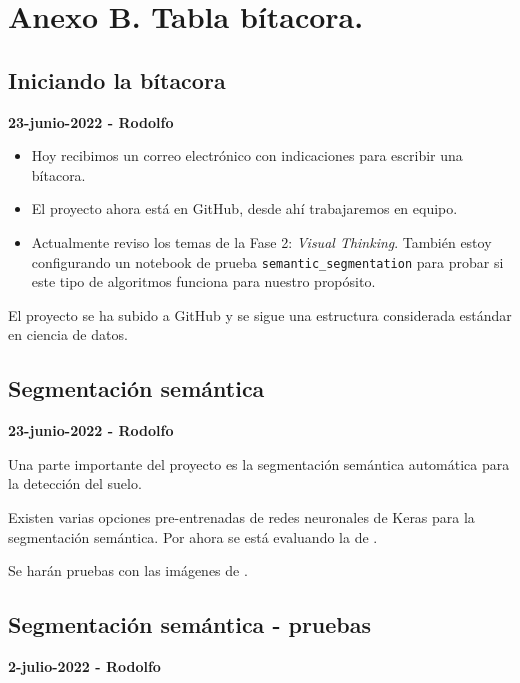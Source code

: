 \section{Anexo B. Tabla bítacora.}


\subsection*{Iniciando la bítacora}

\textbf{23-junio-2022 - Rodolfo}


\begin{itemize}
    \item Hoy recibimos un correo electrónico con indicaciones para escribir una bítacora.
    \item El proyecto ahora está en GitHub, desde ahí trabajaremos en equipo.
    \item Actualmente reviso los temas de la Fase 2: \textit{Visual Thinking}.
     También estoy configurando un notebook de prueba \texttt{semantic\_segmentation} para probar si este tipo de algoritmos funciona para nuestro propósito.
\end{itemize}


El proyecto se ha subido a GitHub y se sigue una estructura considerada estándar en ciencia de datos.

\subsection*{Segmentación semántica}

\textbf{23-junio-2022 - Rodolfo}

Una parte importante del proyecto es la segmentación semántica automática para la detección del suelo.

Existen varias opciones pre-entrenadas de redes neuronales de Keras para la segmentación semántica. Por ahora se está evaluando la de \textcite{gupta2022}.

Se harán pruebas con las imágenes de \textcite{unity2022}.

\subsection*{Segmentación semántica - pruebas}

\textbf{2-julio-2022 - Rodolfo}

